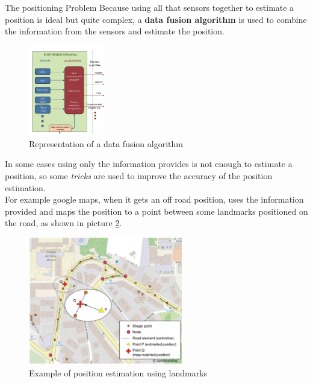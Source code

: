 \begin{section}{The positioning Problem}
    Because using all that sensors together to estimate a position is ideal but quite complex,
    a \textbf{data fusion algorithm} is used to combine the information from the sensors and estimate
    the position.\\
    \begin{figure}[h]
      \centering
      \includegraphics[width=0.3\textwidth]{img/wireless/data fusion algorithms.png}
      \caption{Representation of a data fusion algorithm}
      \label{fig:GNSS data fusion}
    \end{figure}
    In some cases using only the information provides is not enough to estimate a position, so
    some \textit{tricks} are used to improve the accuracy of the position estimation.\\
    For example google maps, when it gets an off road position, uses the information provided and
    maps the position to a point between some landmarks positioned on the road, as shown in picture
    \ref{fig:maps example}.\\

    \begin{figure}[h]
      \centering
      \includegraphics[width=0.6\textwidth]{img/wireless/maps example.png}
      \caption{Example of position estimation using landmarks}
      \label{fig:maps example}
    \end{figure}
  \end{section}

